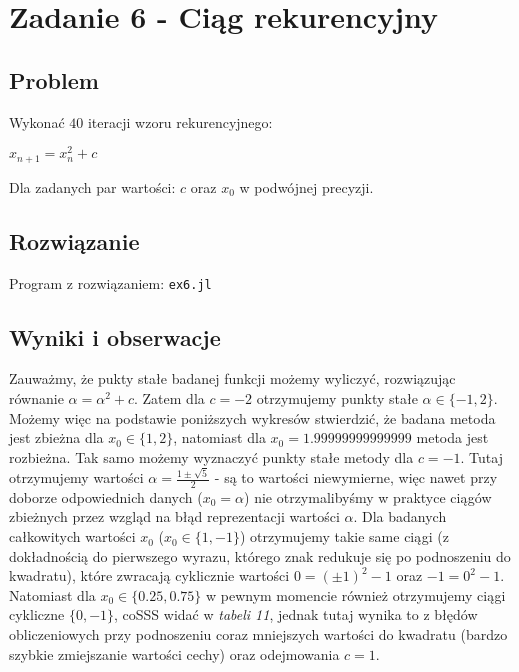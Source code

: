 \documentclass[12pt]{article}
\begin{document}
\section*{Zadanie 6 - Ciąg rekurencyjny}
    \subsection*{Problem}
        Wykonać $40$ iteracji wzoru rekurencyjnego:
        \begin{center}
        \begin{math}
            x_{n+1} = x_n^2 + c
        \end{math}
        \end{center}
        \noindent Dla zadanych par wartości: $c$ oraz $x_0$ w podwójnej precyzji.

    \subsection*{Rozwiązanie}
        Program z rozwiązaniem: \texttt{ex6.jl}

    \subsection*{Wyniki i obserwacje}
        Zauważmy, że pukty stałe badanej funkcji możemy wyliczyć, rozwiązując równanie $\alpha = \alpha^2 + c$.
        \newline\newline
        Zatem dla $c = -2$ otrzymujemy punkty stałe $\alpha \in \{-1, 2\}$. Możemy więc na podstawie poniższych wykresów stwierdzić, że badana metoda jest zbieżna dla $x_0 \in \{1, 2\}$, natomiast dla $x_0 = 1.99999999999999$ metoda jest rozbieżna.
        \newline\newline
        Tak samo możemy wyznaczyć punkty stałe metody dla $c = -1$. Tutaj otrzymujemy wartości $\alpha = \frac{1 \pm \sqrt{5}}{2}$ - są to wartości niewymierne, więc nawet przy doborze odpowiednich danych ($x_0 = \alpha$) nie otrzymalibyśmy w praktyce ciągów zbieżnych przez wzgląd na błąd reprezentacji wartości $\alpha$.
        \newline
        Dla badanych całkowitych wartości $x_0$ ($x_0 \in \{1, -1\}$) otrzymujemy takie same ciągi (z dokładnością do pierwszego wyrazu, którego znak redukuje się po podnoszeniu do kwadratu), które zwracają cyklicznie wartości $0 = (\pm 1)^2 - 1$ oraz $-1 = 0^2 - 1$.
        \newline
        Natomiast dla $x_0 \in \{0.25, 0.75\}$ w pewnym momencie również otrzymujemy ciągi cykliczne $\{0, -1\}$, coSSS widać w \textit{tabeli 11}, jednak tutaj wynika to z błędów obliczeniowych przy podnoszeniu coraz mniejszych wartości do kwadratu (bardzo szybkie zmiejszanie wartości cechy) oraz odejmowania $c = 1$.
\end{document}
